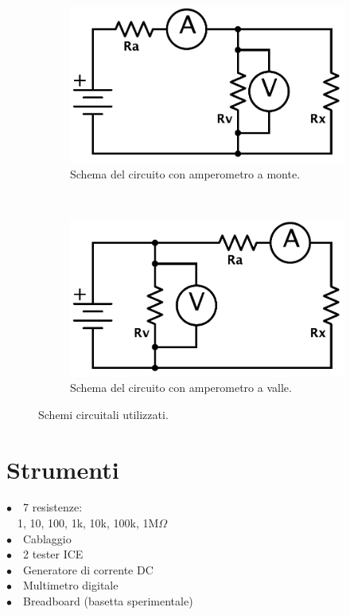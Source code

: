 \begin{figure}
    \begin{subfigure}[h!]{0.3\textwidth}
        \includegraphics[width=\textwidth]{R_monte.pdf}
        \caption{Schema del circuito con amperometro a monte.}
        \label{fig:monte}
    \end{subfigure}%
    ~~ %
    \begin{subfigure}[h!]{0.3\textwidth}
        \includegraphics[width=\textwidth]{R_valle.pdf}
        \caption{Schema del circuito con amperometro a valle.}
        \label{fig:valle}
    \end{subfigure}%
    \caption{Schemi circuitali utilizzati.}
    \label{fig:circuiti}
\end{figure}


\section{Strumenti}

$\bullet \quad$7 resistenze:\\
\phantom{x}$\quad$1, 10, 100, 1k, 10k, 100k, 1M$\Omega$\\
$\bullet \quad$Cablaggio\\
$\bullet \quad$2 tester ICE\\
$\bullet \quad$Generatore di corrente DC\\
$\bullet \quad$Multimetro digitale\\
$\bullet \quad$Breadboard (basetta sperimentale)\\